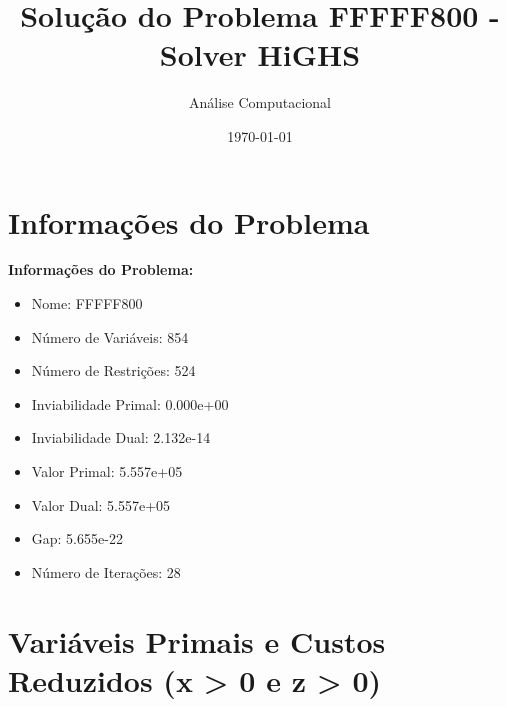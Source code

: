 \documentclass[12pt]{article}
\title{Solução do Problema FFFFF800 - Solver HiGHS}
\author{Análise Computacional}
\date{\today}
\begin{document}
\maketitle

\section{Informações do Problema}

\textbf{Informações do Problema:}
\begin{itemize}
\item Nome: FFFFF800
\item Número de Variáveis: 854
\item Número de Restrições: 524
\item Inviabilidade Primal: 0.000e+00
\item Inviabilidade Dual: 2.132e-14
\item Valor Primal: 5.557e+05
\item Valor Dual: 5.557e+05
\item Gap: 5.655e-22
\item Número de Iterações: 28
\end{itemize}


\section{Variáveis Primais e Custos Reduzidos (x > 0 e z > 0)}
\end{document}
